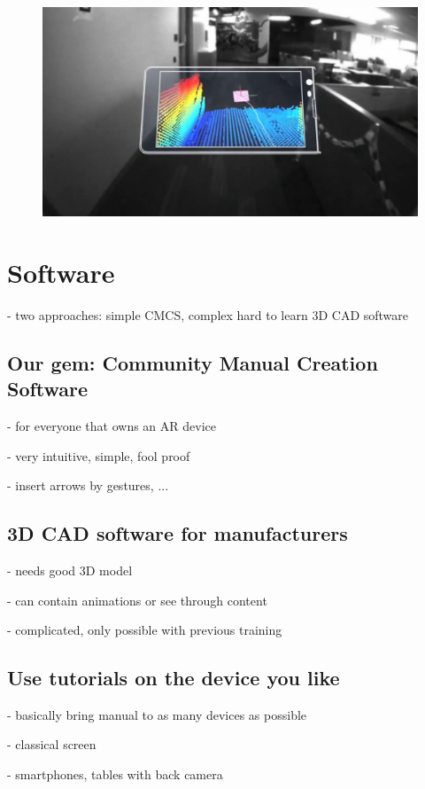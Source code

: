 		\begin{figure}[H]
			\centering
			\includegraphics[width=0.7\linewidth]{../images/project-tango}
			\caption{}
			\label{fig:project-tango}
		\end{figure}
		
	
	\section{Software}
	
		- two approaches: simple CMCS, complex hard to learn 3D CAD software
		
		\subsection{Our gem: Community Manual Creation Software}
		
			- for everyone that owns an AR device
			
			- very intuitive, simple, fool proof
			
			- insert arrows by gestures, ...
	
		\subsection{3D CAD software for manufacturers}
		
			- needs good 3D model
			
			- can contain animations or see through content

			- complicated, only possible with previous training

		\subsection{Use tutorials on the device you like}
		
			- basically bring manual to as many devices as possible
			
			- classical screen
			
			- smartphones, tables with back camera
			
